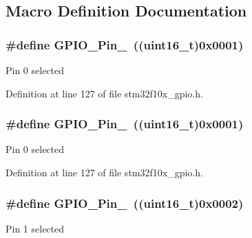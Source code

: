 \subsection{Macro Definition Documentation}
\subsubsection[{\texorpdfstring{G\+P\+I\+O\+\_\+\+Pin\+\_\+0}{GPIO_Pin_0}}]{\setlength{\rightskip}{0pt plus 5cm}\#define G\+P\+I\+O\+\_\+\+Pin\+\_~(({\bf uint16\+\_\+t})0x0001)}\hypertarget{group___g_p_i_o__pins__define_gab305b8d1be9f89bf2b4a05589b456049}{}\label{group___g_p_i_o__pins__define_gab305b8d1be9f89bf2b4a05589b456049}
Pin 0 selected 

Definition at line 127 of file stm32f10x\+\_\+gpio.\+h.

\subsubsection[{\texorpdfstring{G\+P\+I\+O\+\_\+\+Pin\+\_\+0}{GPIO_Pin_0}}]{\setlength{\rightskip}{0pt plus 5cm}\#define G\+P\+I\+O\+\_\+\+Pin\+\_~(({\bf uint16\+\_\+t})0x0001)}\hypertarget{group___g_p_i_o__pins__define_gab305b8d1be9f89bf2b4a05589b456049}{}\label{group___g_p_i_o__pins__define_gab305b8d1be9f89bf2b4a05589b456049}
Pin 0 selected 

Definition at line 127 of file stm32f10x\+\_\+gpio.\+h.

\subsubsection[{\texorpdfstring{G\+P\+I\+O\+\_\+\+Pin\+\_\+1}{GPIO_Pin_1}}]{\setlength{\rightskip}{0pt plus 5cm}\#define G\+P\+I\+O\+\_\+\+Pin\+\_~(({\bf uint16\+\_\+t})0x0002)}\hypertarget{group___g_p_i_o__pins__define_ga29db642c26f1fa0fffc3ecadcd30f82b}{}\label{group___g_p_i_o__pins__define_ga29db642c26f1fa0fffc3ecadcd30f82b}
Pin 1 selected 

